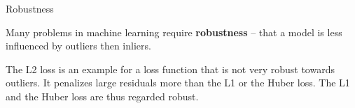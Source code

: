 \begin{frame}[t]{Robustness}

Many problems in machine learning require \textbf{robustness} -- that a model is less influenced by outliers then inliers. 
\vspace*{0.2cm}

The L2 loss is an example for a loss function that is not very robust towards outliers. It penalizes large residuals more than the L1 or the Huber loss. The L1 and the Huber loss are thus regarded robust. 

\begin{overlayarea}{\textwidth}{\textheight}
\begin{center}
\end{center}
\end{overlayarea} 

\end{frame}


